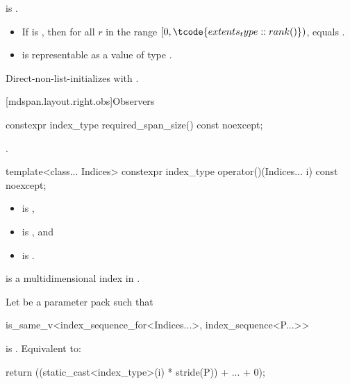 \begin{itemdescr}
\pnum
\constraints
{} is .

\pnum
\expects
\begin{itemize}
\item
If  is ,
then for all $r$ in the range $[0, \tcode{extents_type::rank()})$,
 equals
.
\item
{} is representable as
a value of type .
\end{itemize}

\pnum
\effects
Direct-non-list-initializes  with .
\end{itemdescr}

[mdspan.layout.right.obs]{Observers}

%
\begin{itemdecl}
constexpr index_type required_span_size() const noexcept;
\end{itemdecl}

\begin{itemdescr}
\pnum
\returns
{}.
\end{itemdescr}

%
\begin{itemdecl}
template<class... Indices>
  constexpr index_type operator()(Indices... i) const noexcept;
\end{itemdecl}

\begin{itemdescr}
\pnum
\constraints
\begin{itemize}
\item
{} is ,
\item
{} is , and
\item
{} is
.
\end{itemize}

\pnum
\expects
{} is
a multidimensional index in .

\pnum
\effects
Let  be a parameter pack such that
\begin{codeblock}
is_same_v<index_sequence_for<Indices...>, index_sequence<P...>>
\end{codeblock}
is . Equivalent to:
\begin{codeblock}
return ((static_cast<index_type>(i) * stride(P)) + ... + 0);
\end{codeblock}
\end{itemdescr}

